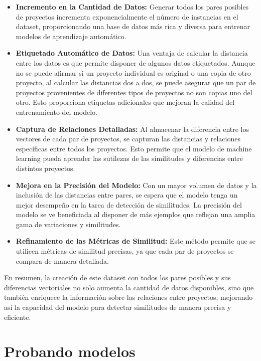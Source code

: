 \begin{itemize}
	\item {\bf Incremento en la Cantidad de Datos:} Generar todos los pares posibles de proyectos incrementa exponencialmente el número de instancias en el dataset, proporcionando una base de datos más rica y diversa para entrenar modelos de aprendizaje automático.
	
	\item {\bf Etiquetado Automático de Datos:} Una ventaja de calcular la distancia entre los datos es que permite disponer de algunos datos etiquetados. Aunque no se puede afirmar si un proyecto individual es original o una copia de otro proyecto, al calcular las distancias dos a dos, se puede asegurar que un par de proyectos provenientes de diferentes tipos de proyectos no son copias uno del otro. Esto proporciona etiquetas adicionales que mejoran la calidad del entrenamiento del modelo.

	\item {\bf Captura de Relaciones Detalladas:} Al almacenar la diferencia entre los vectores de cada par de proyectos, se capturan las distancias y relaciones específicas entre todos los proyectos. Esto permite que el modelo de machine learning pueda aprender las sutilezas de las similitudes y diferencias entre distintos proyectos.
	
	\item {\bf Mejora en la Precisión del Modelo:} Con un mayor volumen de datos y la inclusión de las distancias entre pares, se espera que el modelo tenga un mejor desempeño en la tarea de detección de similitudes. La precisión del modelo se ve beneficiada al disponer de más ejemplos que reflejan una amplia gama de variaciones y similitudes.
	
	\item {\bf Refinamiento de las Métricas de Similitud:} Este método permite que se utilicen métricas de similitud precisas, ya que cada par de proyectos se compara de manera detallada. 

\end{itemize}

En resumen, la creación de este dataset con todos los pares posibles y sus diferencias vectoriales no solo aumenta la cantidad de datos disponibles, sino que también enriquece la información sobre las relaciones entre proyectos, mejorando así la capacidad del modelo para detectar similitudes de manera precisa y eficiente.  

\section{Probando modelos}

